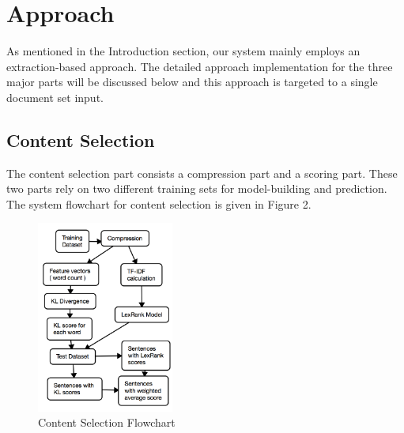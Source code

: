 \documentclass[11pt]{article}
\begin{document}
\section{Approach}

As mentioned in the Introduction section, our system mainly employs an extraction-based approach. The detailed approach implementation for the three major parts will be discussed below and this approach is targeted to a single document set input.

\subsection{Content Selection}
The content selection part consists a compression part and a scoring part. These two parts rely on two different training sets for model-building and prediction. The system flowchart for content selection is given in Figure 2.
\begin{figure}
\begin{center}
\includegraphics[width=0.4\textwidth]{cs_flow.png}
\caption{Content Selection Flowchart}
\end{center}
\end{figure}
\end{document}

